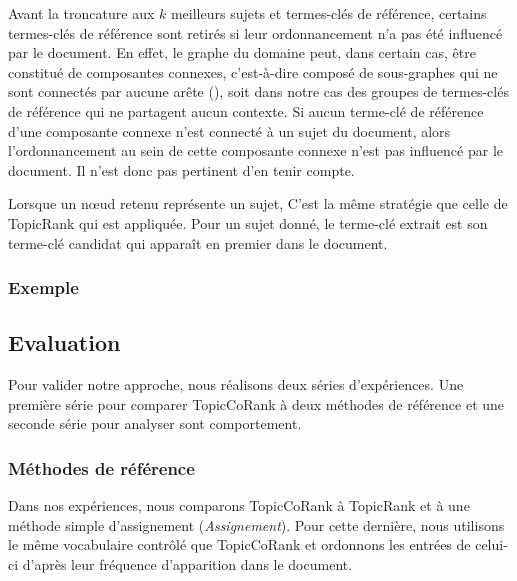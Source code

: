         Avant la troncature aux $k$ meilleurs sujets et termes-clés de
        référence, certains termes-clés de référence sont retirés si leur
        ordonnancement n'a pas été influencé par le document. En effet, le
        graphe du domaine peut, dans certain cas, être constitué de composantes
        connexes, c'est-à-dire composé de sous-graphes qui ne sont connectés par
        aucune arête (), soit dans notre cas des groupes de
        termes-clés de référence qui ne partagent aucun contexte. Si aucun
        terme-clé de référence d'une composante connexe n'est connecté à un
        sujet du document, alors l'ordonnancement au sein de cette composante
        connexe n'est pas influencé par le document. Il n'est donc pas pertinent
        d'en tenir compte.

        Lorsque un n\oe{}ud retenu représente un sujet, C'est la même stratégie
        que celle de TopicRank qui est appliquée. Pour un sujet donné, le
        terme-clé extrait est son terme-clé candidat qui apparaît en premier
        dans le document.

      \subsubsection{Exemple}
      \label{subsubsec:main-automatic_keyphrase_annotation-supervised_automatic_keyphrase_extraction-topiccorank-exemple}
        \TODO{\dots}

    \subsection{Evaluation}
    \label{subsec:main-automatic_keyphrase_annotation-supervised_automatic_keyphrase_annotation-evaluation}
      Pour valider notre approche, nous réalisons deux séries d'expériences. Une
      première série pour comparer TopicCoRank à deux méthodes de référence et
      une seconde série pour analyser sont comportement.

      \subsubsection{Méthodes de référence}
      \label{subsubsec:main-automatic_keyphrase_annotation-supervised_automatic_keyphrase_annotation-evaluation-baselines}
        Dans nos expériences, nous comparons TopicCoRank à TopicRank et à
        une méthode simple d'assignement (\textit{Assignement}). Pour cette
        dernière, nous utilisons le même vocabulaire contrôlé que TopicCoRank et
        ordonnons les entrées de celui-ci d'après leur fréquence d'apparition
        dans le document. 

